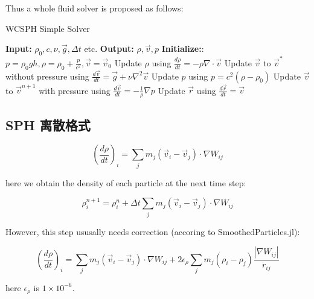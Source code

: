 \begin{frame}
    Thus a whole fluid solver is proposed as follows:

\begin{algorithm}[H]
    \caption{WCSPH Simple Solver}
    \begin{algorithmic}[1]
        \State \textbf{Input:} $\rho_0, c, \nu, \vec{g}, \Delta t$ etc.
        \State \textbf{Output:} $\rho, \vec{v}, p$
        \State \textbf{Initialize:}:
        $p = \rho_0 g h, \rho = \rho_0 + \frac{p}{c^2}, \vec{v} = \vec{v}_0$
                \State Update $\rho$ using $\frac{d\rho}{dt}= -\rho \nabla\cdot \vec{v}$
            \EndFor
                \State Update $\vec{v}$ to $\vec{v}^*$ without pressure using $\frac{d\vec{v}}{dt}= \vec{g} + \nu \nabla^2 \vec{v}$
            \EndFor
                \State Update $p$ using $p = c^2(\rho - \rho_0)$
            \EndFor
                \State Update $\vec{v}$ to $\vec{v}^{n+1}$ with pressure using $\frac{d\vec{v}}{dt}= -\frac{1}{\rho}\nabla p$
                \State Update $\vec{r}$ using $\frac{d\vec{r}}{dt}= \vec{v}$
            \EndFor
        \EndWhile
    \end{algorithmic}
\end{algorithm}
\end{frame}

\subsection{SPH 离散格式}

\begin{frame}
    \begin{equation}
        \left(\frac{d\rho}{dt}\right)_i = 
        \sum_j m_j (\vec{v}_i-\vec{v}_j)\cdot \nabla W_{ij}
    \end{equation}
    
    here we obtain the density of each particle at the next time step:
    
    \begin{equation}
        \rho_i^{n+1} = \rho_i^n + \Delta t \sum_j m_j (\vec{v}_i-\vec{v}_j)\cdot \nabla W_{ij}
    \end{equation}
    
    However, this step ususally needs correction (accoring to SmoothedParticles.jl):
    
    \begin{equation}
        \left(\frac{d\rho}{dt}\right)_i = 
        \sum_j m_j (\vec{v}_i-\vec{v}_j)\cdot \nabla W_{ij}+
        2\epsilon_\rho\sum_j m_j (\rho_i-\rho_j)\frac{|\nabla W_{ij}|}{r_{ij}}
    \end{equation}
    
    here $\epsilon_\rho$ is $1\times 10^{-6}$.
\end{frame}

